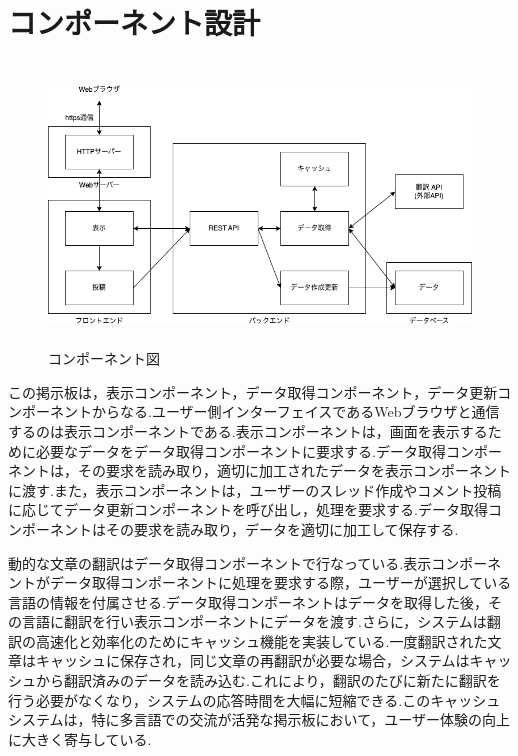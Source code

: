 \documentclass[b5paper,12pt,dvipdfmx]{jsreport}
\begin{document}

\section{コンポーネント設計}

\begin{figure}[htbp]
	\centering
	\includegraphics[width=130mm,height=75mm]{./img/components.png}

	\caption*{コンポーネント図}
\end{figure}

この掲示板は，表示コンポーネント，データ取得コンポーネント，データ更新コンポーネントからなる.ユーザー側インターフェイスであるWebブラウザと通信するのは表示コンポーネントである.表示コンポーネントは，画面を表示するために必要なデータをデータ取得コンポーネントに要求する.データ取得コンポーネントは，その要求を読み取り，適切に加工されたデータを表示コンポーネントに渡す.また，表示コンポーネントは，ユーザーのスレッド作成やコメント投稿に応じてデータ更新コンポーネントを呼び出し，処理を要求する.データ取得コンポーネントはその要求を読み取り，データを適切に加工して保存する.

動的な文章の翻訳はデータ取得コンポーネントで行なっている.表示コンポーネントがデータ取得コンポーネントに処理を要求する際，ユーザーが選択している言語の情報を付属させる.データ取得コンポーネントはデータを取得した後，その言語に翻訳を行い表示コンポーネントにデータを渡す.さらに，システムは翻訳の高速化と効率化のためにキャッシュ機能を実装している.一度翻訳された文章はキャッシュに保存され，同じ文章の再翻訳が必要な場合，システムはキャッシュから翻訳済みのデータを読み込む.これにより，翻訳のたびに新たに翻訳を行う必要がなくなり，システムの応答時間を大幅に短縮できる.このキャッシュシステムは，特に多言語での交流が活発な掲示板において，ユーザー体験の向上に大きく寄与している.
\end{document}
